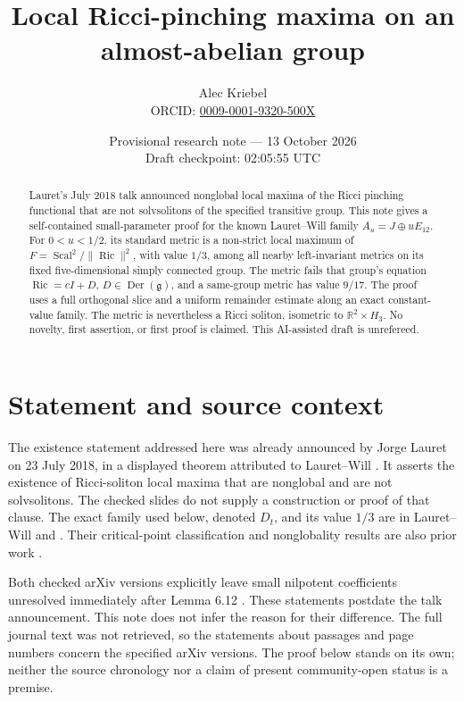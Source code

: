 \documentclass[11pt]{article}
\title{Local Ricci-pinching maxima on an almost-abelian group}
\author{Alec Kriebel\\
\small ORCID: \href{https://orcid.org/0009-0001-9320-500X}{0009-0001-9320-500X}}
\date{Provisional research note --- 13 October 2026\\
\small Draft checkpoint: 02:05:55 UTC}
\newcommand{\R}{\mathbb R}
\newcommand{\Ric}{\operatorname{Ric}}
\newcommand{\Scal}{\operatorname{Scal}}
\newcommand{\Der}{\operatorname{Der}}
\newcommand{\norm}[1]{\lVert #1\rVert}
\begin{document}
\maketitle
\begin{abstract}
Lauret's July 2018 talk announced nonglobal local maxima of the Ricci
pinching functional that are not solvsolitons of the specified transitive
group. This note gives a self-contained small-parameter proof for the
known Lauret--Will family \(A_u=J\oplus uE_{12}\).
For \(0<u<1/2\), its standard metric is a non-strict local maximum of
\(F=\Scal^2/\norm{\Ric}^2\), with value \(1/3\), among all nearby
left-invariant metrics on its fixed five-dimensional simply connected
group. The metric fails that group's equation \(\Ric=cI+D\),
\(D\in\Der(\mathfrak g)\), and a same-group metric has value \(9/17\).
The proof uses a full orthogonal slice and a uniform remainder estimate
along an exact constant-value family. The metric is nevertheless a Ricci
soliton, isometric to \(\R^2\times H_3\). No novelty, first assertion, or
first proof is claimed. This AI-assisted draft is unrefereed.
\end{abstract}

\section{Statement and source context}

The existence statement addressed here was already announced by Jorge
Lauret on 23 July 2018, in a displayed theorem attributed to
Lauret--Will \cite[slide 13/17, overlay PDF pp.~71--73]{talk}.
It asserts the existence of Ricci-soliton local maxima that are
nonglobal and are not solvsolitons. The checked slides do not supply a
construction or proof of that clause.
The exact family used below, denoted \(D_t\), and its value \(1/3\)
are in Lauret--Will \cite[\S6.4, p.~19]{LWv1} and
\cite[\S6.4, p.~20]{LWv2}. Their critical-point classification and
nonglobality results are also prior work
\cite[Theorem 1.5, Theorem 6.5(iii), Proposition 6.11]{LWv2}.

Both checked arXiv versions explicitly leave small nilpotent
coefficients unresolved immediately after Lemma 6.12
\cite[pp.~18--19]{LWv1}\cite[p.~19]{LWv2}.
These statements postdate the talk announcement. This note does not
infer the reason for their difference. The full journal text was not
retrieved, so the statements about passages and page numbers concern
the specified arXiv versions. The proof below stands on its own;
neither the source chronology nor a claim of present community-open
status is a premise.
\end{document}
